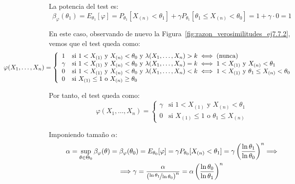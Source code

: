 \begin{ejercicio}
\begin{description}
\begin{description}
            La potencia del test es:
            \begin{equation*}
                \beta_\varphi(\theta_1) = E_{\theta_1}[\varphi] = P_{\theta_1}[X_{(n)} < \theta_1] + \gamma P_{\theta_1}[\theta_1 \leq X_{(n)} < \theta_0] = 1 + \gamma \cdot 0 = 1
            \end{equation*}

            \item[Subcaso $k = \left(\nicefrac{\ln \theta_0}{\ln \theta_1}\right)^n$.] En este caso, observando de nuevo la Figura~\ref{fig:razon_verosimilitudes_ej7.7.2}, vemos que el test queda como:
            \begin{equation*}
                \hspace{-2.5cm}\varphi(X_1, \ldots, X_n) = \left\{\begin{array}{ll}
                    1 & \text{si\ } 1 < X_{(1)} \text{\ y\ } X_{(n)} < \theta_0 \text{\ y\ } \lambda(X_1, \ldots, X_n) > k \iff \text{(nunca)} \\
                    \gamma & \text{si\ } 1 < X_{(1)} \text{\ y\ } X_{(n)} < \theta_0 \text{\ y\ } \lambda(X_1, \ldots, X_n) = k \iff 1 < X_{(1)} \text{\ y\ } X_{(n)} < \theta_1 \\
                    0 & \text{si\ } 1 < X_{(1)} \text{\ y\ } X_{(n)} < \theta_0 \text{\ y\ } \lambda(X_1, \ldots, X_n) < k \iff 1 < X_{(1)} \text{\ y\ } \theta_1 \leq X_{(n)} < \theta_0 \\
                    0 & \text{si\ } X_{(1)} \leq 1 \text{\ o\ } X_{(n)} \geq \theta_0
                \end{array}\right.
            \end{equation*}

            Por tanto, el test queda como:
            \begin{equation*}
                \varphi(X_1, \ldots, X_n) = \left\{\begin{array}{ll}
                    \gamma & \text{si\ } 1 < X_{(1)} \text{\ y\ } X_{(n)} < \theta_1 \\
                    0 & \text{si\ } X_{(1)} \leq 1 \text{\ o\ } \theta_1 \leq X_{(n)}
                \end{array}\right.
            \end{equation*}

            Imponiendo tamaño $\alpha$:
            \begin{multline*}
                \alpha = \sup_{\theta \in \Theta_0}\beta_\varphi(\theta) = \beta_\varphi(\theta_0) = E_{\theta_0}[\varphi] = \gamma P_{\theta_0}[X_{(n)} < \theta_1] = \gamma \left(\frac{\ln \theta_1}{\ln \theta_0}\right)^n \Longrightarrow \\ \Longrightarrow \gamma = \frac{\alpha}{\left(\nicefrac{\ln \theta_1}{\ln \theta_0}\right)^n} = \alpha\left(\frac{\ln \theta_0}{\ln \theta_1}\right)^n
            \end{multline*}


\end{description}
\end{description}
\end{ejercicio}
